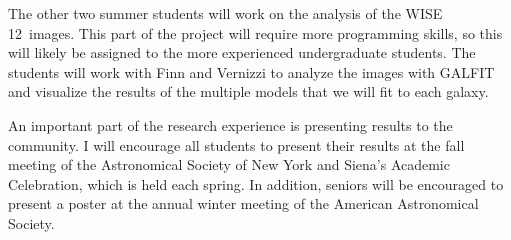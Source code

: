 \documentclass[11pt, preprint]{aastex}
\newcommand{\ha}{$H\alpha$}
\begin{document}
{The other two summer students will work on the analysis of the WISE
12\micron \ images.  This part of the project will require more
programming skills, so this will likely be assigned to the more
experienced undergraduate students.  The students will work with Finn
and Vernizzi to analyze the images with GALFIT and visualize the
results of the multiple models that we will fit to each galaxy.



An important part of the research experience is presenting results
to the community. I will encourage all students 
to present their results at the fall meeting of the 
Astronomical Society of New York and Siena's Academic Celebration, which
is held each spring.  In addition, seniors will be encouraged to
present a poster at the 
annual winter meeting of the American Astronomical Society.  

}
\end{document}
